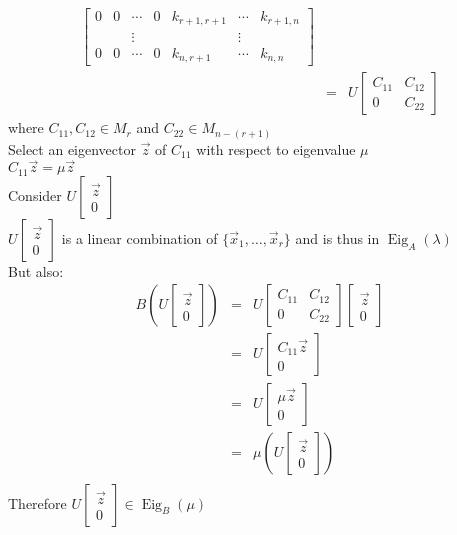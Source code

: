 \documentclass[letterpaper,12pt,fleqn]{article}
\renewcommand{\l}{\lambda}
\newcommand{\m}{\mu}
\newcommand{\vx}{\vec{x}}
\newcommand{\vz}{\vec{z}}
\DeclareMathOperator{\Eig}{Eig}
\begin{document}
\begin{theproof}
\begin{description}
\begin{eqnarray*}
\begin{bmatrix}
          0 & 0 & \cdots & 0 & k_{r+1,r+1} & \cdots & k_{r+1,n} \\
          & & \vdots & & & \vdots & \\
          0 & 0 & \cdots & 0 & k_{n,r+1} & \cdots & k_{n,n}
        \end{bmatrix} \\
        &=& U\begin{bmatrix} C_{11} & C_{12} \\ 0 & C_{22} \end{bmatrix}
    \end{eqnarray*}
    where $C_{11},C_{12}\in M_r$ and $C_{22}\in M_{n-(r+1)}$\\
    Select an eigenvector $\vz$ of $C_{11}$ with respect to eigenvalue $\m$ \\
    $C_{11}\vz=\m\vz$ \\
    Consider $U\begin{bmatrix} \vz \\ 0 \end{bmatrix}$ \\
    $U\begin{bmatrix} \vz \\ 0 \end{bmatrix}$ is a linear combination of
    $\{\vx_1,\ldots,\vx_r\}$ and is thus in $\Eig_A(\l)$ \\
    But also:
    \begin{eqnarray*}
      B\left(U\begin{bmatrix} \vz \\ 0 \end{bmatrix}\right) &=&
      U\begin{bmatrix} C_{11} & C_{12} \\ 0 & C_{22} \end{bmatrix}
      \begin{bmatrix} \vz \\ 0 \end{bmatrix} \\
      &=& U\begin{bmatrix} C_{11}\vz \\ 0 \end{bmatrix} \\
      &=& U\begin{bmatrix} \m\vz \\ 0 \end{bmatrix} \\
      &=& \m\left(U\begin{bmatrix} \vz \\ 0 \end{bmatrix}\right) \\
    \end{eqnarray*}
    Therefore $U\begin{bmatrix} \vz \\ 0 \end{bmatrix}\in\Eig_B(\m)$
  \end{description}
\end{theproof}
\end{document}
